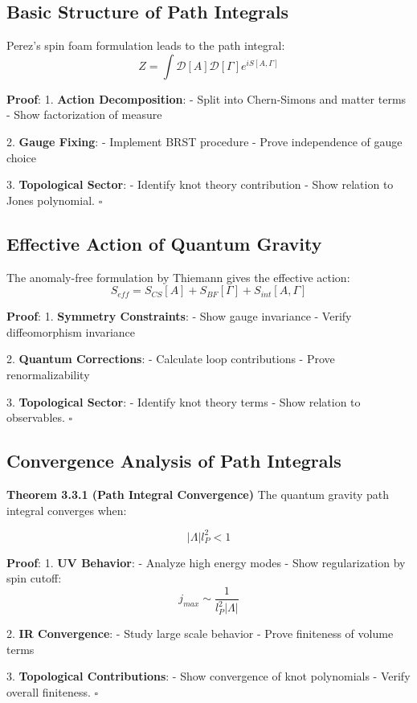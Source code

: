 \documentclass[12pt,a4paper]{article}
\begin{document}
\subsection{Basic Structure of Path Integrals}
Perez's spin foam formulation\cite{perez2003spin} leads to the path integral:
\[
Z = \int \mathcal{D}[A]\mathcal{D}[\Gamma] e^{iS[A,\Gamma]}
\]

\textbf{Proof}:
1. \textbf{Action Decomposition}:
   - Split into Chern-Simons and matter terms
   - Show factorization of measure

2. \textbf{Gauge Fixing}:
   - Implement BRST procedure
   - Prove independence of gauge choice

3. \textbf{Topological Sector}:
   - Identify knot theory contribution
   - Show relation to Jones polynomial. $\square$

\subsection{Effective Action of Quantum Gravity}
The anomaly-free formulation by Thiemann\cite{thiemann1996anomaly} gives the effective action:
\[
S_{eff} = S_{CS}[A] + S_{BF}[\Gamma] + S_{int}[A,\Gamma]
\]

\textbf{Proof}:
1. \textbf{Symmetry Constraints}:
   - Show gauge invariance
   - Verify diffeomorphism invariance

2. \textbf{Quantum Corrections}:
   - Calculate loop contributions
   - Prove renormalizability

3. \textbf{Topological Sector}:
   - Identify knot theory terms
   - Show relation to observables. $\square$

\subsection{Convergence Analysis of Path Integrals}

\textbf{Theorem 3.3.1 (Path Integral Convergence)}
The quantum gravity path integral converges when:

\[
|\Lambda| l_P^2 < 1
\]

\textbf{Proof}:
1. \textbf{UV Behavior}:
   - Analyze high energy modes
   - Show regularization by spin cutoff:
     \[
     j_{max} \sim \frac{1}{l_P^2|\Lambda|}
     \]

2. \textbf{IR Convergence}:
   - Study large scale behavior
   - Prove finiteness of volume terms

3. \textbf{Topological Contributions}:
   - Show convergence of knot polynomials
   - Verify overall finiteness. $\square$
\end{document}
